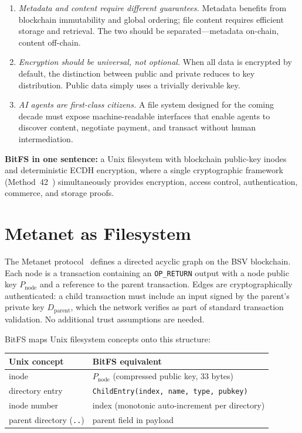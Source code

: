 \documentclass[11pt,a4paper]{article}
\begin{document}
\begin{enumerate}
\item \emph{Metadata and content require different guarantees.} Metadata benefits from blockchain immutability and global ordering; file content requires efficient storage and retrieval. The two should be separated---metadata on-chain, content off-chain.
\item \emph{Encryption should be universal, not optional.} When all data is encrypted by default, the distinction between public and private reduces to key distribution. Public data simply uses a trivially derivable key.
\item \emph{AI agents are first-class citizens.} A file system designed for the coming decade must expose machine-readable interfaces that enable agents to discover content, negotiate payment, and transact without human intermediation.
\end{enumerate}

\textbf{BitFS in one sentence:} a Unix filesystem with blockchain public-key inodes and deterministic ECDH encryption, where a single cryptographic framework (Method~42~\cite{method42}) simultaneously provides encryption, access control, authentication, commerce, and storage proofs.

\section{Metanet as Filesystem}

The Metanet protocol~\cite{metanet} defines a directed acyclic graph on the BSV blockchain. Each node is a transaction containing an \texttt{OP\_RETURN} output with a node public key $P_{\text{node}}$ and a reference to the parent transaction. Edges are cryptographically authenticated: a child transaction must include an input signed by the parent's private key $D_{\text{parent}}$, which the network verifies as part of standard transaction validation. No additional trust assumptions are needed.

BitFS maps Unix filesystem concepts onto this structure:

\begin{table}[h]
\centering
\begin{tabular}{@{}ll@{}}
\toprule
\textbf{Unix concept} & \textbf{BitFS equivalent} \\
\midrule
inode & $P_{\text{node}}$ (compressed public key, 33 bytes) \\
directory entry & \texttt{ChildEntry(index, name, type, pubkey)} \\
inode number & index (monotonic auto-increment per directory) \\
parent directory (\texttt{..}) & parent field in payload \\
\bottomrule
\end{tabular}
\end{table}
\end{document}
